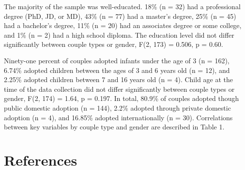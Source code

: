 \documentclass[man]{apa6}
\begin{document}
The majority of the sample was well-educated. 18\% (n = 32) had a professional degree (PhD, JD, or MD), 43\% (n = 77) had a master's degree, 25\% (n = 45) had a bachelor's degree, 11\% (n = 20) had an associates degree or some college, and 1\% (n = 2) had a high school diploma. The education level did not differ significantly between couple types or gender, F(2, 173) = 0.506, p = 0.60.

Ninety-one percent of couples adopted infants under the age of 3 (n = 162), 6.74\% adopted children between the ages of 3 and 6 years old (n = 12), and 2.25\% adopted children between 7 and 16 years old (n = 4). Child age at the time of the data collection did not differ significantly between couple types or gender, F(2, 174) = 1.64, p = 0.197. In total, 80.9\% of couples adopted though public domestic adoption (n = 144), 2.2\% adopted through private domestic adoption (n = 4), and 16.85\% adopted internationally (n = 30).
Correlations between key variables by couple type and gender are described in Table 1.

\newpage

\hypertarget{references}{%
\section{References}\label{references}}

\begingroup
\setlength{\parindent}{-0.5in}
\setlength{\leftskip}{0.5in}

\hypertarget{refs}{}

\endgroup
\end{document}
